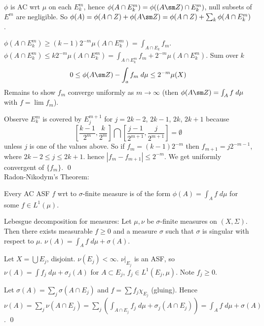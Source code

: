 $\phi$ is AC wrt $\mu$ on each $E_k^m$, hence $\phi(A \cap E_k^m)= \phi((A \sm Z) \cap E_k^m)$, null subsets of $E^m$ are negligible. So $\phi(A) = \phi(A \cap Z) + \phi(A \sm Z) = \phi(A \cap Z) + \sum_k \phi(A \cap E_k^m)$. 


$\phi(A \cap E_k^m) \geq (k-1) 2^{-m} \mu(A \cap E_k^m)= \int_{A \cap E_k} f_m$. $\phi(A \cap E_k^m) \leq k 2^{-m} \mu(A \cap E_k^m)= \int_{A \cap E_k^m} f_m + 2^{-m} \mu(A \cap E_k^m)$. Sum over $k$
        \[
        0 \leq \phi(A \sm Z) - \int_a f_m \; d\mu \leq 2^{-m} \mu(X)
        \]
Remains to show $f_m$ converge uniformly as $m \to \infty$ (then $\phi(A \sm Z)= \int_A f \; d\mu$ with $f= \lim f_m$). 


Observe $E_k^m$ is covered by $E_j^{m+1}$ for $j= 2k-2$, $2k-1$, $2k$, $2k+1$ because
	\[
	\left[ \dfrac{k-1}{2^m}, \dfrac{k}{2^m} \right] \bigcap \left[ \dfrac{j-1}{2^{m+1}}, \dfrac{j}{2^{m+1}} \right]= \emptyset
	\]
unless $j$ is one of the values above. So if $f_m = (k-1) 2^{-m}$ then $f_{m+1}= j 2^{-m-1}$, where $2k-2 \leq j \leq 2k+1$. hence $|f_m- f_{m+1}| \leq 2^{-m}$. We get uniformly convergent of $\{f_m\}$. \qed \\



Radon-Nikodym's Theorem:

Every AC ASF $f$ wrt to $\sigma$-finite measure is of the form $\phi(A)= \int_A f \; d\mu$ for some $f \in L^1(\mu)$. 



Lebesgue decomposition for measures: Let $\mu, \nu$ be $\sigma$-finite measures on $(X,\Sigma)$. Then there exists measurable $f \geq 0$ and a measure $\sigma$ such that $\sigma$ is singular with respect to $\mu$. $\nu(A)= \int_A f \; d\mu + \sigma(A)$.

\pf Let $X= \bigcup E_j$, disjoint. $\nu(E_j)< \infty$. $\nu \big|_{E_j}$ is an ASF, so $\nu(A)= \int f_j \; d\mu + \sigma_j(A)$ for $A \subset E_j$, $f_j \in L^1(E_j, \mu)$. Note $f_j \geq 0$.

Let $\sigma(A) = \sum_j \sigma(A \cap E_j)$ and $f= \sum f_j \chi_{E_j}$ (gluing). Hence $\nu(A)= \sum_j \nu(A \cap E_j)= \sum_j (\int_{A \cap E_j} f_j \; d\mu+ \sigma_j(A \cap E_j))= \int_A f \; d\mu + \sigma(A)$. \qed \\
































